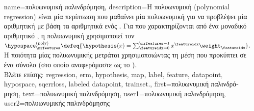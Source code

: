 {name={\foreignlanguage{greek}{πολυωνυμική παλινδρόμηση}}, 
	description={\foreignlanguage{greek}{Η πολυωνυμική} 
		 (polynomial regression) \foreignlanguage{greek}{είναι μία περίπτωση}  \foreignlanguage{greek}{που 
		μαθαίνει μία πολυωνυμική}   \foreignlanguage{greek}{για να προβλέψει μία αριθμητική} 
		 \foreignlanguage{greek}{με βάση τα αριθμητικά}  \foreignlanguage{greek}{ενός} 
		. \foreignlanguage{greek}{Για}  \foreignlanguage{greek}{που 
		χαρακτηρίζονται από ένα μοναδικό αριθμητικό} , 
		\foreignlanguage{greek}{η πολυωνυμική}  \foreignlanguage{greek}{χρησιμοποιεί τον}  
		$\hypospace^{(\rm poly)}_{\nrfeatures} \defeq \{ \hypothesis(x) = \sum_{\featureidx=0}^{\nrfeatures-1} x^{\featureidx} \weight_{\featureidx} \}.$
		\foreignlanguage{greek}{Η ποιότητα μίας πολυωνυμικής}   \foreignlanguage{greek}{μετράται 
		χρησιμοποιώντας τη μέση}  \foreignlanguage{greek}{που προκύπτει σε ένα σύνολο} 
		 (\foreignlanguage{greek}{στο οποίο αναφερόμαστε ως το} ).
		\\
		\foreignlanguage{greek}{Βλέπε επίσης:} \gls{regression}, \gls{erm}, \gls{hypothesis}, \gls{map}, \gls{label}, \gls{feature}, \gls{datapoint}, 
		\gls{hypospace}, \gls{sqerrloss}, \gls{labeled datapoint}, \gls{trainset}.},
	first={\foreignlanguage{greek}{πολυωνυμική παλινδρόμηση}},
	text={\foreignlanguage{greek}{πολυωνυμική παλινδρόμηση}},
	user1={\foreignlanguage{greek}{πολυωνυμική παλινδρόμηση}}, %
	user2={\foreignlanguage{greek}{πολυωνυμικής παλινδρόμησης}} %
}

